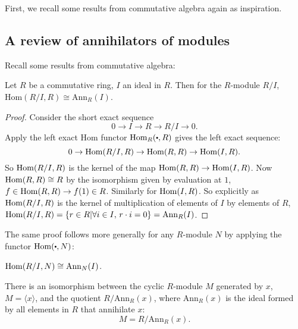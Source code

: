     First, we recall some results from commutative algebra again as inspiration.

    \subsection{A review of annihilators of modules}
    
    Recall some results from commutative algebra:

    \begin{lem} Let \(R\) be a commutative ring, \(I\) an ideal in \(R\). Then for the \(R\)-module \(R/I\), \( \mathrm{Hom}(R/I,R) \cong  \mathrm{Ann}_R(I)\).
    \end{lem} 
    
    \begin{proof}
       Consider the short exact sequence
       \[ 0 \rightarrow I \rightarrow R \rightarrow R/I \rightarrow 0. \]
       Apply the left exact Hom functor \(\Hom_R(\sbt,R)\) gives the left exact sequence:
       \[ 0 \rightarrow \mathrm{Hom}(R/I,R) \rightarrow \mathrm{Hom}(R,R) \rightarrow \mathrm{Hom}(I,R). \]
       So \( \mathrm{Hom}(R/I,R)\) is the kernel of the map \( \mathrm{Hom}(R,R) \rightarrow \mathrm{Hom}(I,R)\). Now \( \mathrm{Hom}(R,R) \cong R\) by the isomorphism given by evaluation at \(1\), \( f \in \mathrm{Hom}(R,R) \rightarrow f(1) \in R\). Similarly for \(\mathrm{Hom}(I,R)\). So explicitly as \(\mathrm{Hom}(R/I,R)\) is the kernel of multiplication of elements of \(I\) by elements of \(R\), \( \mathrm{Hom}(R/I,R) = \{ r \in R | \forall i \in I, \,r \cdot i = 0 \} = \mathrm{Ann}_R(I)\).
    \end{proof}
    
    The same proof follows more generally for any \(R\)-module \(N\) by applying the functor \( \Hom(\sbt, N)\):
    \begin{corollary}
       \(\mathrm{Hom}(R/I,N) \cong \mathrm{Ann}_{N}(I)\).
    \end{corollary}
       
    \begin{lem} There is an isomorphism between the cyclic \(R\)-module \(M\) generated by \(x\), \(M = \langle x \rangle \), and the quotient 
    \( R / \mathrm{Ann}_R(x)\), where \( \mathrm{Ann}_R(x)\) is the ideal formed by all elements in \(R\) that annihilate \(x\):
    \[M =R/\mathrm{Ann}_R(x).\]
    \end{lem}
    
